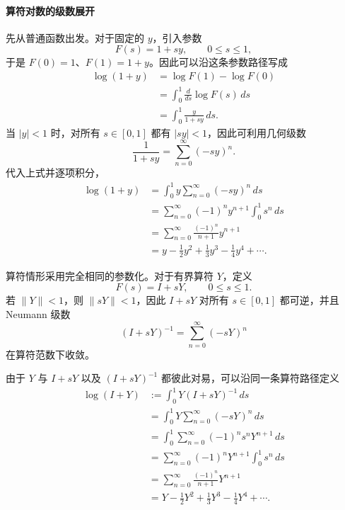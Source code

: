 \documentclass[UTF8,a4paper,11pt,openany]{ctexbook}
\begin{document}
\paragraph{算符对数的级数展开}

先从普通函数出发。对于固定的 $y$，引入参数
\[
F(s)=1+sy,\qquad 0\leq s\leq1,
\]
于是 $F(0)=1$、$F(1)=1+y$。因此可以沿这条参数路径写成
\begin{align}
    \log(1+y)
    &=
    \log F(1)-\log F(0)
    \nonumber\\
    &=
    \int_0^1
    \frac{d}{ds}\log F(s)\,ds
    \nonumber\\
    &=
    \int_0^1
    \frac{y}{1+sy}\,ds.
\end{align}
当 $|y|<1$ 时，对所有 $s\in[0,1]$ 都有 $|sy|<1$，因此可利用几何级数
\[
\frac{1}{1+sy}
=
\sum_{n=0}^{\infty}(-sy)^n.
\]
代入上式并逐项积分，
\begin{align}
    \log(1+y)
    &=
    \int_0^1
    y\sum_{n=0}^{\infty}(-sy)^n\,ds
    \nonumber\\
    &=
    \sum_{n=0}^{\infty}
    (-1)^n y^{n+1}
    \int_0^1s^n\,ds
    \nonumber\\
    &=
    \sum_{n=0}^{\infty}
    \frac{(-1)^n}{n+1}y^{n+1}
    \nonumber\\
    &=
    y-\frac12y^2+\frac13y^3-\frac14y^4+\cdots.
\end{align}

算符情形采用完全相同的参数化。对于有界算符 $Y$，定义
\[
F(s)=I+sY,\qquad 0\leq s\leq1.
\]
若 $\|Y\|<1$，则 $\|sY\|<1$，因此 $I+sY$ 对所有
$s\in[0,1]$ 都可逆，并且 Neumann 级数
\begin{equation}
    (I+sY)^{-1}
    =
    \sum_{n=0}^{\infty}(-sY)^n
\end{equation}
在算符范数下收敛。

由于 $Y$ 与 $I+sY$ 以及 $(I+sY)^{-1}$ 都彼此对易，可以沿同一条算符路径定义
\begin{align}
    \log(I+Y)
    &:=
    \int_0^1
    Y(I+sY)^{-1}\,ds
    \nonumber\\
    &=
    \int_0^1
    Y\sum_{n=0}^{\infty}(-sY)^n\,ds
    \nonumber\\
    &=
    \int_0^1
    \sum_{n=0}^{\infty}
    (-1)^ns^nY^{n+1}\,ds
    \nonumber\\
    &=
    \sum_{n=0}^{\infty}
    (-1)^nY^{n+1}
    \int_0^1s^n\,ds
    \nonumber\\
    &=
    \sum_{n=0}^{\infty}
    \frac{(-1)^n}{n+1}Y^{n+1}
    \nonumber\\
    &=
    Y-\frac12Y^2+\frac13Y^3-\frac14Y^4+\cdots.
\end{align}
\end{document}
